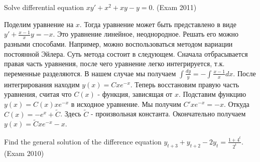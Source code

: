\begin{problem}
Solve differential equation $xy'+x^{2} +xy-y=0$. (Exam 2011)
\end{problem}

\begin{solution}
Поделим уравнение на $x$. Тогда уравнение может быть представлено в виде $y'+\frac{x-1}{x} y=-x$. Это уравнение линейное, неоднородное. Решать его можно разными способами. Например, можно воспользоваться методом вариации постоянной Эйлера. Суть метода состоит в следующем. Сначала отбрасывается правая часть уравнения, после чего уравнение легко интегрируется, т.к. переменные разделяются. В нашем случае мы получаем $\int \frac{dy}{y} =-\int \frac{x-1}{x} dx  $. После интегрирования находим $y(x)=Cxe^{-x} $. Теперь восстановим правую часть уравнения, считая что $C(x)$ - функция, зависящая от $x$. Подставим функцию $y(x)=C(x)xe^{-x} $ в исходное уравнение. Мы получим $C'xe^{-x} =-x$. Откуда $C(x)=-e^{x} +\tilde{C}$. Здесь $\tilde{C}$ - произвольная константа. Окончательно получаем $y(x)=\tilde{C}xe^{-x} -x$.
\end{solution}

\begin{problem}
Find the general solution of the difference equation $y_{t+3} +y_{t+2} -2y_{t} =\frac{1+4^{t} }{2^{t} } $. (Exam 2010)
\end{problem}

